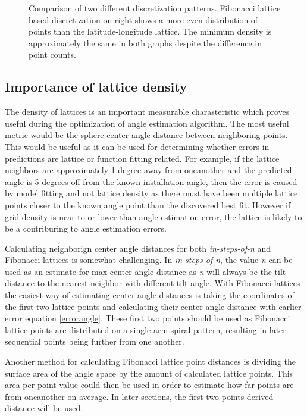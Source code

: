 \begin{figure}
\caption{Comparison of two different discretization patterns. Fibonacci lattice based discretization on right shows a more even distribution of points than the latitude-longitude lattice. The minimum density is approximately the same in both graphs despite the difference in point counts.}
     \label{fig_5stepfibolat}
\end{figure}

\subsection{Importance of lattice density}\label{ss_lattice_density}
The density of lattices is an important measurable charasteristic which proves useful during the optimization of angle estimation algorithm. The most useful metric would be the sphere center angle distance between neighboring points. This would be useful as it can be used for determining whether errors in predictions are lattice or function fitting related. For example, if the lattice neighbors are approximately 1 degree away from oneanother and the predicted angle is 5 degrees off from the known installation angle, then the error is caused by model fitting and not lattice density as there must have been multiple lattice points closer to the known angle point than the discovered best fit. However if grid density is near to or lower than angle estimation error, the lattice is likely to be a contriburing to angle estimation errors.

Calculating neighborign center angle distances for both \textit{in-steps-of-n} and Fibonacci lattices is somewhat challenging. In \textit{in-steps-of-n}, the value \textit{n} can be used as an estimate for max center angle distance as \textit{n} will always be the tilt distance to the nearest neighbor with different tilt angle. With Fibonacci lattices the easiest way of estimating center angle distances is taking the coordinates of the first two lattice points and calculating their center angle distance with earlier error equation \ref{errorangle}. These first two points should be used as Fibonacci lattice points are distributed on a single arm spiral pattern, resulting in later sequential points being further from one another.

Another method for calculating Fibonacci lattice point distances is dividing the surface area of the angle space by the amount of calculated lattice points. This area-per-point value could then be used in order to estimate how far points are from oneanother on average. In later sections, the first two points derived distance will be used.

